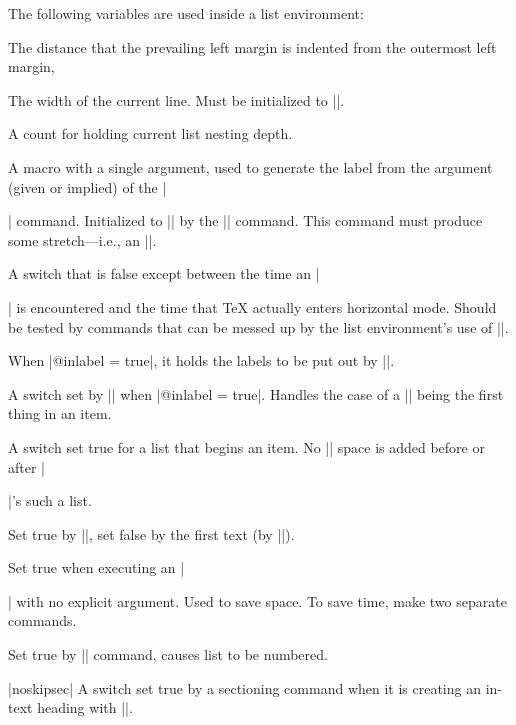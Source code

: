  The following variables are used inside a list environment:
 \begin{description}
 \item[]  The distance that the prevailing left
     margin is indented from the outermost left margin,
 \item[]  The width of the current line.  Must be
     initialized to |\hsize|.
 \item[]  A count for holding current list nesting depth.
 
 \item[]  A macro with a single argument, used to
   generate the label from the argument (given or implied)
   of the |\item| command. Initialized to |\@mklab| by the |\list|
   command.  This command must produce  some stretch---i.e., an
   |\hfil|.
   
 \item[]  A switch that is false except between the time
   an |\item| is encountered and the time that \TeX{}
   actually enters horizontal mode.  Should be tested by commands
   that can be messed up by the list environment's use of |\everypar|.
   
 \item[]  When |@inlabel = true|, it holds the labels
   to be put out by |\everypar|.
   
 \item[]  A switch set by |\list| when
   |@inlabel = true|.
      Handles the case of a |\list| being the first thing in an item.
      
 \item[]  A switch set true for a list that begins an
   item.  No |\topsep| space is added before or after |\item|'s such a
   list.
   
 \item[]  Set true by |\list|, set false by the first
   text (by |\everypar|).
   
 \item[]   Set true when executing an |\item| with no
   explicit argument.  Used to save space. To save time, make two
   separate   commands.
   
 \item[]  Set true by |\usecounter| command, causes
   list to be numbered.
   
 \item[] |noskipsec| A switch set true by a sectioning command when
    it is creating an in-text heading with |\everypar|.
 \end{description}


